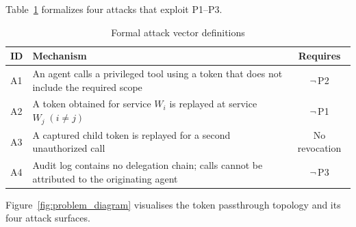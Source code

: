 \documentclass[journal]{IEEEtran}
\begin{document}
Table~\ref{tab:attack_formal} formalizes four attacks that exploit P1--P3.

\begin{table}[h]
\caption{Formal attack vector definitions}
\label{tab:attack_formal}
\centering
\footnotesize
\setlength{\tabcolsep}{3pt}
\begin{tabularx}{\columnwidth}{l X c}
\toprule
\textbf{ID} & \textbf{Mechanism} & \textbf{Requires} \\
\midrule
A1 & An agent calls a privileged tool using a token that does not include
     the required scope & $\neg$\,P2 \\
A2 & A token obtained for service $W_i$ is replayed at service $W_j\;(i\neq j)$
     & $\neg$\,P1 \\
A3 & A captured child token is replayed for a second unauthorized call
     & No revocation \\
A4 & Audit log contains no delegation chain; calls cannot be attributed
     to the originating agent & $\neg$\,P3 \\
\bottomrule
\end{tabularx}
\end{table}

Figure~\ref{fig:problem_diagram} visualises the token passthrough topology and
its four attack surfaces.
\end{document}
